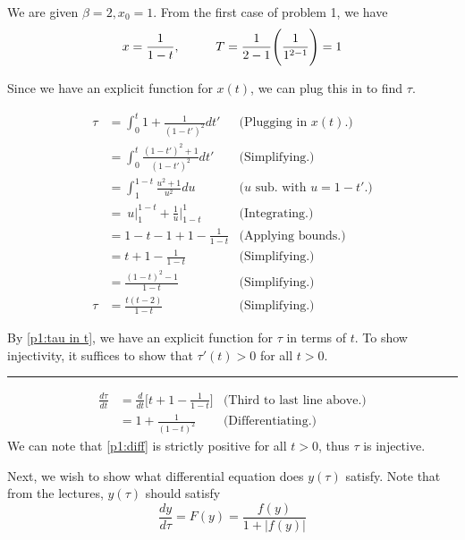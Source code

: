 \partbreak
\begin{solution}

    We are given $\beta = 2, x_0 = 1$. From the first case of problem 1, we have
    \[
    x = \frac{1}{1 - t}, \hspace{10mm} T = \frac{1}{2 - 1}\Bigg(\frac{1}{1^{2 - 1}}\Bigg) = 1
    \]

    Since we have an explicit function for $x(t)$, we can plug this in to find $\tau$.

    \alignbreak
    \begin{align}
        \tau &= \int_0^{t} 1 + \frac{1}{(1 - t')^2}dt' &\text{(Plugging in $x(t)$.)}\nonumber\\
        &= \int_0^{t} \frac{(1 - t')^2 + 1}{(1 - t')^2}dt' &\text{(Simplifying.)}\nonumber\\
        &= \int_1^{1-t} \frac{u^2 + 1}{u^2} du &\text{($u$ sub. with $u = 1 - t'$.)} \nonumber\\
        &= \ u\bigg|_1^{1 - t} + \frac{1}{u}\bigg|^1_{1 - t} &\text{(Integrating.)}\nonumber\\
        &= 1 - t - 1 + 1 - \frac{1}{1 - t} &\text{(Applying bounds.)}\nonumber\\
        &= t + 1 - \frac{1}{1-t} &\text{(Simplifying.)}\nonumber\\
        &= \frac{(1 - t)^2 - 1}{1 - t} &\text{(Simplifying.)}\nonumber\\
        \tau&= \frac{t(t - 2)}{1 - t} &\text{(Simplifying.)} \label{p1:tau in t}
    \end{align}
    \alignbreak

    By \ref{p1:tau in t}, we have an explicit function for $\tau$ in terms of $t$. To show injectivity, it suffices to show that $\tau'(t) > 0$ for all $t > 0$.

    \begin{center}\rule{15cm}{0.5pt}\end{center}
    \begin{align}
        \frac{d\tau}{dt} &= \frac{d}{dt}\bigg[ t + 1 - \frac{1}{1 - t}\bigg] &\text{(Third to last line above.)}\nonumber\\
        &= 1 + \frac{1}{(1 - t)^2} &\text{(Differentiating.)} \label{p1:diff}
    \end{align}
    \alignbreak
    We can note that \ref{p1:diff} is strictly positive for all $t > 0$, thus $\tau$ is injective.

    Next, we wish to show what differential equation does $y(\tau)$ satisfy. Note that from the lectures, $y(\tau)$ should satisfy
    \[\frac{dy}{d\tau} = F(y) = \frac{f(y)}{1 + |f(y)|}\]


\end{solution}
